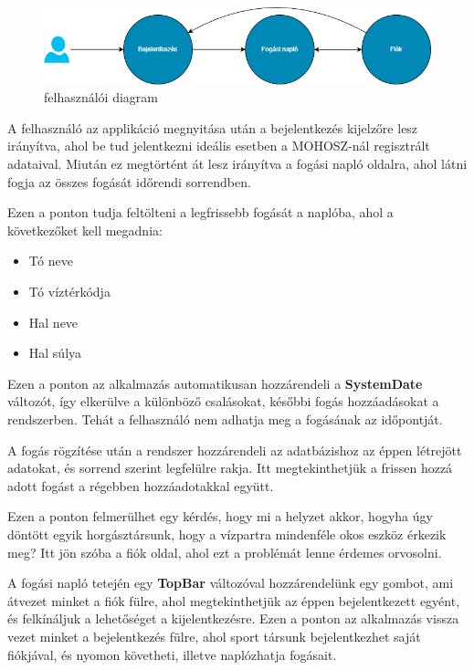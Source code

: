 \begin{figure}[h]
\centering
\includegraphics[scale=0.6]{images/userdiagram.png}
\caption{felhasználói diagram}
\label{fig:userdiagram}
\end{figure}

A felhasználó az applikáció megnyitása után a bejelentkezés kijelzőre lesz irányítva, ahol be tud jelentkezni ideális esetben a MOHOSZ-nál regisztrált adataival. Miután ez megtörtént át lesz irányítva a fogási napló oldalra, ahol látni fogja az összes fogását időrendi sorrendben. 

\vspace{1cm}

Ezen a ponton tudja feltölteni a legfrissebb fogását a naplóba, ahol a következőket kell megadnia:
\begin{itemize}
    \item Tó neve
    \item Tó víztérkódja
    \item Hal neve
    \item Hal súlya
\end{itemize}

Ezen a ponton az alkalmazás automatikusan hozzárendeli a \textbf{SystemDate} változót, így elkerülve a különböző csalásokat, későbbi fogás hozzáadásokat a rendszerben. Tehát a felhasználó nem adhatja meg a fogásának az időpontját.

A fogás rögzítése után a rendszer hozzárendeli az adatbázishoz az éppen létrejött adatokat, és sorrend szerint legfelülre rakja. Itt megtekinthetjük a frissen hozzá adott fogást a régebben hozzáadotakkal együtt.

Ezen a ponton felmerülhet egy kérdés, hogy mi a helyzet akkor, hogyha úgy döntött egyik horgásztársunk, hogy a vízpartra mindenféle okos eszköz érkezik meg?
Itt jön szóba a fiók oldal, ahol ezt a problémát lenne érdemes orvosolni.

A fogási napló tetején egy \textbf{TopBar} változóval hozzárendelünk egy gombot, ami átvezet minket a fiók fülre, ahol megtekinthetjük az éppen bejelentkezett egyént, és felkínáljuk a lehetőséget a kijelentkezésre. Ezen a ponton az alkalmazás vissza vezet minket a bejelentkezés fülre, ahol sport társunk bejelentkezhet saját fiókjával, és nyomon követheti, illetve naplózhatja fogásait.